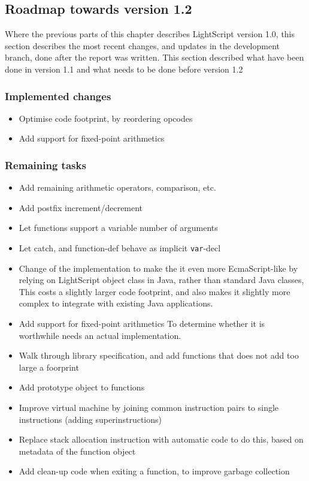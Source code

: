 \documentclass[11pt]{report}
\begin{document}
\subsection{Roadmap towards version 1.2}
Where the previous parts of this chapter describes LightScript version 1.0, this section describes the most recent changes, and updates in the development branch, done after the report was written.
This section described what have been done in version 1.1 and what needs to be done before version 1.2
\subsubsection{Implemented changes}
\begin{itemize}
\item Optimise code footprint, by reordering opcodes
\item Add support for fixed-point arithmetics
\end{itemize}
\subsubsection{Remaining tasks}
\begin{itemize}
\item Add remaining arithmetic operators, comparison, etc. 
\item Add postfix increment/decrement
\item Let functions support a variable number of arguments
\item Let catch, and function-def behave as implicit \verb|var|-decl
\item Change of the implementation to make the it even more EcmaScript-like by relying on LightScript object class in Java, rather than standard Java classes, This costs a slightly larger code footprint, and also makes it slightly more complex to integrate with existing Java applications.
\item Add support for fixed-point arithmetics
To determine whether it is worthwhile needs an actual implementation.
\item Walk through library specification, and add functions that does not add too large a foorprint
\item Add prototype object to functions
\item Improve virtual machine by joining common instruction pairs to single instructions (adding superinstructions)
\item Replace stack allocation instruction with automatic code to do this, based on metadata of the function object 
\item Add clean-up code when exiting a function, to improve garbage collection
\end{itemize}
\end{document}
